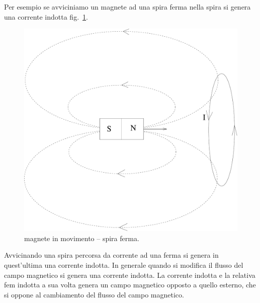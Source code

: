 Per esempio se avviciniamo un magnete ad una spira ferma nella spira si genera una corrente indotta fig.~\ref{magnete_spira}.
\begin{figure}[htbp]
  \centering
  \includegraphics[scale=0.25]{immagini/fisica2/ind_spira01}
  \caption{magnete in movimento -- spira ferma.}
  \label{magnete_spira}
\end{figure}
Avvicinando una spira percorsa da corrente ad una ferma si genera in quest'ultima una corrente indotta. In generale quando si modifica il flusso del campo magnetico si genera una corrente indotta. La corrente indotta e la relativa fem indotta a sua volta genera un campo magnetico opposto a quello esterno, che si oppone al cambiamento del flusso del campo magnetico.

